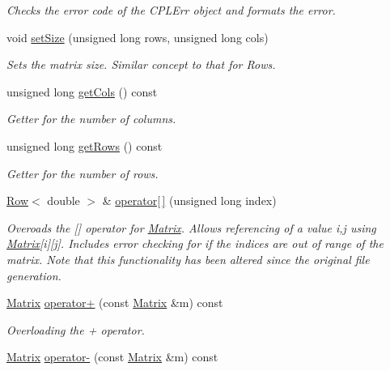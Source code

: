 \begin{DoxyCompactItemize}
\begin{DoxyCompactList}\small\item\em Checks the error code of the C\+P\+L\+Err object and formats the error. \end{DoxyCompactList}\item 
void \hyperlink{class_matrix_aa393296d4132d7aafc4e236ddfe59f06}{set\+Size} (unsigned long rows, unsigned long cols)
\begin{DoxyCompactList}\small\item\em Sets the matrix size. Similar concept to that for Rows. \end{DoxyCompactList}\item 
unsigned long \hyperlink{class_matrix_a9b4ce445c65dcea66c66dda875cc39d8}{get\+Cols} () const
\begin{DoxyCompactList}\small\item\em Getter for the number of columns. \end{DoxyCompactList}\item 
unsigned long \hyperlink{class_matrix_a442879db6473eeab202928dc47992206}{get\+Rows} () const
\begin{DoxyCompactList}\small\item\em Getter for the number of rows. \end{DoxyCompactList}\item 
\hyperlink{class_row}{Row}$<$ double $>$ \& \hyperlink{class_matrix_ae7e14b4bd8bb570260a4e578e4a601b7}{operator\mbox{[}$\,$\mbox{]}} (unsigned long index)
\begin{DoxyCompactList}\small\item\em Overoads the \mbox{[}\mbox{]} operator for \hyperlink{class_matrix}{Matrix}. Allows referencing of a value i,j using \hyperlink{class_matrix}{Matrix}\mbox{[}i\mbox{]}\mbox{[}j\mbox{]}. Includes error checking for if the indices are out of range of the matrix. Note that this functionality has been altered since the original file generation. \end{DoxyCompactList}\item 
\hyperlink{class_matrix}{Matrix} \hyperlink{class_matrix_abdbd1bbdae2f6926cdc2b58faa304826}{operator+} (const \hyperlink{class_matrix}{Matrix} \&m) const
\begin{DoxyCompactList}\small\item\em Overloading the + operator. \end{DoxyCompactList}\item 
\hyperlink{class_matrix}{Matrix} \hyperlink{class_matrix_a73b8da7142ea2593ba7d097651a3ce5c}{operator-\/} (const \hyperlink{class_matrix}{Matrix} \&m) const

\end{DoxyCompactItemize}
